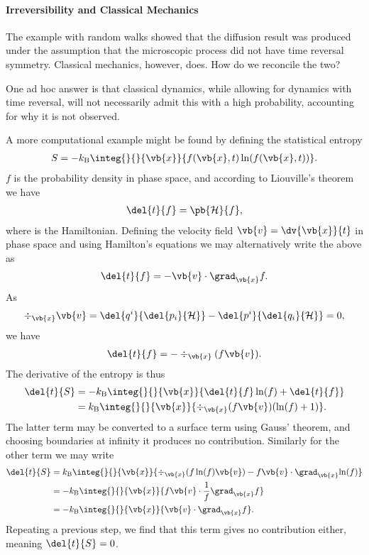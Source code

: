 \paragraph{Irreversibility and Classical Mechanics}
The example with random walks showed that the diffusion result was produced under the assumption that the microscopic process did not have time reversal symmetry. Classical mechanics, however, does. How do we reconcile the two?

One ad hoc answer is that classical dynamics, while allowing for dynamics with time reversal, will not necessarily admit this with a high probability, accounting for why it is not observed.

A more computational example might be found by defining the statistical entropy
\begin{align*}
	S = -\kb\integ{}{}{\vb{x}}{f(\vb{x}, t)\ln(f(\vb{x}, t))}.
\end{align*}
$f$ is the probability density in phase space, and according to Liouville's theorem we have
\begin{align*}
	\del{t}{f} = \pb{\ham}{f},
\end{align*}
where \ham is the Hamiltonian. Defining the velocity field $\vb{v} = \dv{\vb{x}}{t}$ in phase space and using Hamilton's equations we may alternatively write the above as
\begin{align*}
	\del{t}{f} = -\vb{v}\cdot\grad_{\vb{x}}{f}.
\end{align*}
As
\begin{align*}
	\div_{\vb{x}}{\vb{v}} = \del{q^{i}}{\del{p_{i}}{\ham}} - \del{p^{i}}{\del{q_{i}}{\ham}} = 0,
\end{align*}
we have
\begin{align*}
	\del{t}{f} = -\div_{\vb{x}}{(f\vb{v})}.
\end{align*}
The derivative of the entropy is thus
\begin{align*}
	\del{t}{S} &= -\kb\integ{}{}{\vb{x}}{\del{t}{f}\ln(f) + \del{t}{f}} \\
	           &= \kb\integ{}{}{\vb{x}}{\div_{\vb{x}}{(f\vb{v})}(\ln(f) + 1)}.
\end{align*}
The latter term may be converted to a surface term using Gauss' theorem, and choosing boundaries at infinity it produces no contribution. Similarly for the other term we may write
\begin{align*}
	\del{t}{S} &= \kb\integ{}{}{\vb{x}}{\div_{\vb{x}}{(f\ln(f)\vb{v})} - f\vb{v}\cdot\grad_{\vb{x}}{\ln(f)}} \\
	           &= -\kb\integ{}{}{\vb{x}}{f\vb{v}\cdot\frac{1}{f}\grad_{\vb{x}}{f}} \\
	           &= -\kb\integ{}{}{\vb{x}}{\vb{v}\cdot\grad_{\vb{x}}{f}}.
\end{align*}
Repeating a previous step, we find that this term gives no contribution either, meaning $\del{t}{S} = 0$.